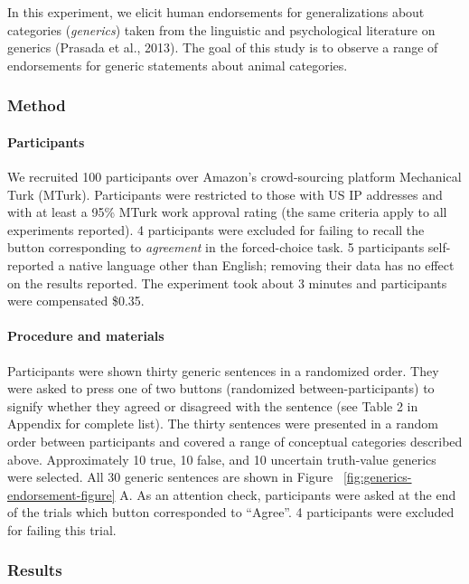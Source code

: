 \documentclass[english,floatsintext,man]{apa6}
\theoremstyle{definition}
\theoremstyle{definition}
\theoremstyle{definition}
\theoremstyle{remark}
\begin{document}
In this experiment, we elicit human endorsements for generalizations
about categories (\emph{generics}) taken from the linguistic and
psychological literature on generics (Prasada et al., 2013). The goal of
this study is to observe a range of endorsements for generic statements
about animal categories.

\subsubsection{Method}\label{method}

\paragraph{Participants}\label{participants}

We recruited 100 participants over Amazon's crowd-sourcing platform
Mechanical Turk (MTurk). Participants were restricted to those with US
IP addresses and with at least a 95\% MTurk work approval rating (the
same criteria apply to all experiments reported). 4 participants were
excluded for failing to recall the button corresponding to
\emph{agreement} in the forced-choice task. 5 participants self-reported
a native language other than English; removing their data has no effect
on the results reported. The experiment took about 3 minutes and
participants were compensated \$0.35.

\paragraph{Procedure and materials}\label{procedure-and-materials}

Participants were shown thirty generic sentences in a randomized order.
They were asked to press one of two buttons (randomized
between-participants) to signify whether they agreed or disagreed with
the sentence (see Table 2 in Appendix for complete list). The thirty
sentences were presented in a random order between participants and
covered a range of conceptual categories described above. Approximately
10 true, 10 false, and 10 uncertain truth-value generics were selected.
All 30 generic sentences are shown in Figure
~\ref{fig:generics-endorsement-figure} A. As an attention check,
participants were asked at the end of the trials which button
corresponded to \enquote{Agree}. 4 participants were excluded for
failing this trial.

\subsubsection{Results}\label{results}
\end{document}
